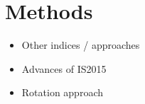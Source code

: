 \section{Methods}

\begin{itemize}
\item Other indices / approaches
\item Advances of IS2015
\item Rotation approach
\end{itemize}